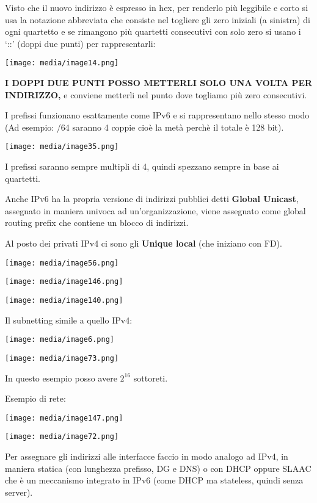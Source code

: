 Visto che il nuovo indirizzo è espresso in hex, per renderlo più
leggibile e corto si usa la notazione abbreviata che consiste nel
togliere gli zero iniziali (a sinistra) di ogni quartetto e se rimangono
più quartetti consecutivi con solo zero si usano i `::' (doppi due
punti) per rappresentarli:

\texttt{[image: media/image14.png]}

\textbf{I DOPPI DUE PUNTI POSSO METTERLI SOLO UNA VOLTA PER INDIRIZZO,}
e conviene metterli nel punto dove togliamo più zero consecutivi.

I prefissi funzionano esattamente come IPv6 e si rappresentano nello
stesso modo (Ad esempio: /64 saranno 4 coppie cioè la metà perchè il
totale è 128 bit).

\texttt{[image: media/image35.png]}

I prefissi saranno sempre multipli di 4, quindi spezzano sempre in base
ai quartetti.

Anche IPv6 ha la propria versione di indirizzi pubblici detti
\textbf{Global Unicast}, assegnato in maniera univoca ad
un'organizzazione, viene assegnato come global routing prefix che
contiene un blocco di indirizzi.

Al posto dei privati IPv4 ci sono gli \textbf{Unique local} (che
iniziano con FD).

\texttt{[image: media/image56.png]}

\texttt{[image: media/image146.png]}

\texttt{[image: media/image140.png]}

Il subnetting simile a quello IPv4:

\texttt{[image: media/image6.png]}

\texttt{[image: media/image73.png]}

In questo esempio posso avere \(2^{16}\) sottoreti.

Esempio di rete:

\texttt{[image: media/image147.png]}

\texttt{[image: media/image72.png]}

Per assegnare gli indirizzi alle interfacce faccio in modo analogo ad
IPv4, in maniera statica (con lunghezza prefisso, DG e DNS) o con DHCP
oppure SLAAC che è un meccanismo integrato in IPv6 (come DHCP ma
stateless, quindi senza server).

